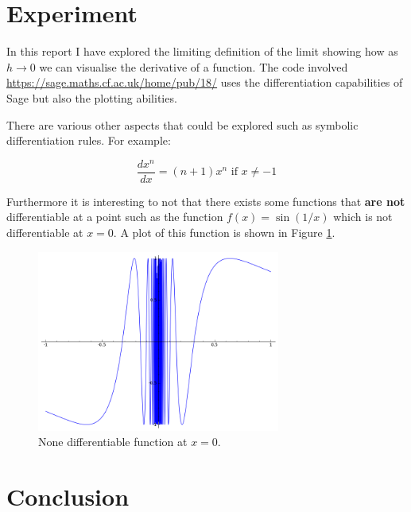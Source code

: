 \documentclass[a4paper]{article}
\begin{document}
\section{Experiment}\label{exp}

In this report I have explored the limiting definition of the limit showing how as $h\to 0$ we can visualise the derivative of a function. The code involved \url{https://sage.maths.cf.ac.uk/home/pub/18/} uses the differentiation capabilities of Sage but also the plotting abilities.

There are various other aspects that could be explored such as symbolic differentiation rules. For example:

$$\frac{dx^n}{dx}=(n+1)x^{n}\text{ if }x\ne-1$$

Furthermore it is interesting to not that there exists some functions that \textbf{are not} differentiable at a point such as the function $f(x)=\sin(1/x)$ which is not differentiable at $x=0$. A plot of this function is shown in Figure \ref{notdiff}.

\begin{figure}[!htbp]
\begin{center}
\includegraphics[width=8cm]{sage2.png}
\end{center}
\caption{None differentiable function at $x=0$.}\label{notdiff}
\end{figure}

\section{Conclusion}\label{conclusion}




\end{document}

